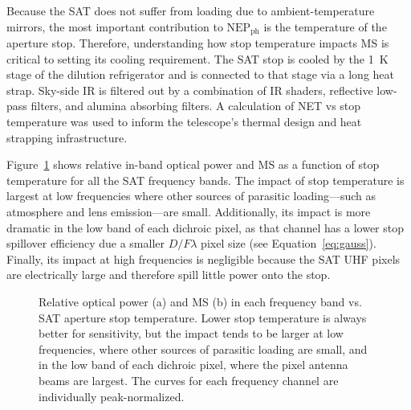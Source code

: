 Because the SAT does not suffer from loading due to ambient-temperature mirrors, the most important contribution to $\mathrm{NEP}_{\mathrm{ph}}$ is the temperature of the aperture stop. Therefore, understanding how stop temperature impacts MS is critical to setting its cooling requirement. 
The SAT stop is cooled by the 1~K stage of the dilution refrigerator and is connected to that stage via a long heat strap. Sky-side IR is filtered out by a combination of IR shaders, reflective low-pass filters, and alumina absorbing filters. A calculation of NET vs stop temperature was used to inform the telescope's thermal design and heat strapping infrastructure.

Figure~\ref{fig:so_stop_temperature} shows relative in-band optical power and MS as a function of stop temperature for all the SAT frequency bands. The impact of stop temperature is largest at low frequencies where other sources of parasitic loading---such as atmosphere and lens emission---are small. Additionally, its impact is more dramatic in the low band of each dichroic pixel, as that channel has a lower stop spillover efficiency due a smaller $D / F \lambda$ pixel size (see Equation~\ref{eq:gauss}). Finally, its impact at high frequencies is negligible because the SAT UHF pixels are electrically large and therefore spill little power onto the stop. 

\begin{figure}[!t]
    \hfill
    \caption{Relative optical power (a) and MS (b) in each frequency band vs. SAT aperture stop temperature. Lower stop temperature is always better for sensitivity, but the impact tends to be larger at low frequencies, where other sources of parasitic loading are small, and in the low band of each dichroic pixel, where the pixel antenna beams are largest. The curves for each frequency channel are individually peak-normalized. \label{fig:so_stop_temperature}}
\end{figure}


